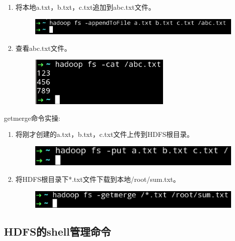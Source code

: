 \documentclass {article}
\begin{document}
\begin{enumerate}
					\item 将本地a.txt，b.txt，c.txt追加到abc.txt文件。
					\begin{figure}[H]
						\centering
						\includegraphics{figures/fig14.png}
					\end{figure}
				
					\item 查看abc.txt文件。
					\begin{figure}[H]
						\centering
						\includegraphics{figures/fig15.png}
					\end{figure}
				\end{enumerate}
			
			 	getmerge命令实操:
			 	\begin{enumerate}
			 		\item 将刚才创建的a.txt，b.txt，c.txt文件上传到HDFS根目录。
			 		\begin{figure}[H]
			 			\centering
			 			\includegraphics{figures/fig16.png}
			 		\end{figure}
		 		
		 			\item 将HDFS根目录下*.txt文件下载到本地/root/sum.txt。
		 			\begin{figure}[H]
		 				\centering
		 				\includegraphics{figures/fig17.png}
		 			\end{figure}
			 	\end{enumerate}
		 	
	 	\subsection{HDFS的shell管理命令}
\end{document}
